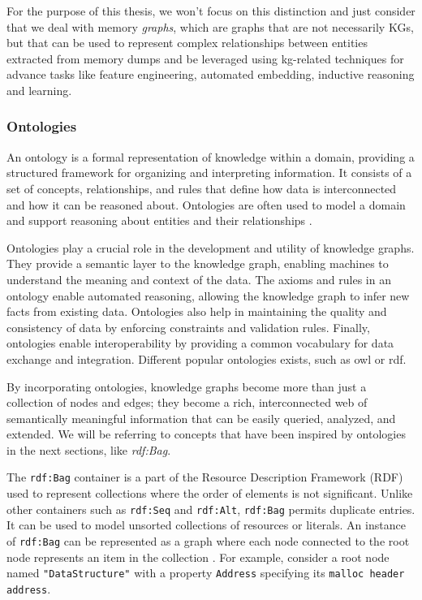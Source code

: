     For the purpose of this thesis, we won't focus on this distinction and just consider that we deal with memory \textit{graphs}, which are graphs that are not necessarily KGs, but that can be used to represent complex relationships between entities extracted from memory dumps and be leveraged using \acrshort{kg}-related techniques for advance tasks like feature engineering, automated embedding, inductive reasoning and learning.

    \subsubsection{Ontologies}\label{sec:background:ontology}
    An ontology is a formal representation of knowledge within a domain, providing a structured framework for organizing and interpreting information. It consists of a set of concepts, relationships, and rules that define how data is interconnected and how it can be reasoned about. Ontologies are often used to model a domain and support reasoning about entities and their relationships \cite{KG22}.

    Ontologies play a crucial role in the development and utility of knowledge graphs. They provide a semantic layer to the knowledge graph, enabling machines to understand the meaning and context of the data. The axioms and rules in an ontology enable automated reasoning, allowing the knowledge graph to infer new facts from existing data. Ontologies also help in maintaining the quality and consistency of data by enforcing constraints and validation rules. Finally, ontologies enable interoperability by providing a common vocabulary for data exchange and integration. Different popular ontologies exists, such as \acrfull{owl} or \acrfull{rdf}.

    By incorporating ontologies, knowledge graphs become more than just a collection of nodes and edges; they become a rich, interconnected web of semantically meaningful information that can be easily queried, analyzed, and extended. We will be referring to concepts that have been inspired by ontologies in the next sections, like \textit{rdf:Bag}.

    The \texttt{rdf:Bag} container is a part of the Resource Description Framework (RDF) used to represent collections where the order of elements is not significant. Unlike other containers such as \texttt{rdf:Seq} and \texttt{rdf:Alt}, \texttt{rdf:Bag} permits duplicate entries. It can be used to model unsorted collections of resources or literals. An instance of \texttt{rdf:Bag} can be represented as a graph where each node connected to the root node represents an item in the collection \cite{OrderedDataInRDF20}. For example, consider a root node named \texttt{"DataStructure"} with a property \texttt{Address} specifying its \texttt{malloc header address}.

